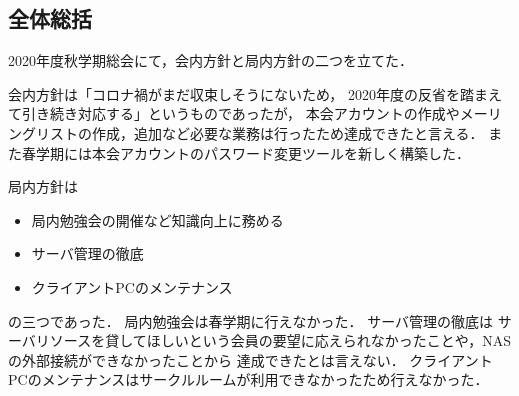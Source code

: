 \subsection*{全体総括}


2020年度秋学期総会にて，会内方針と局内方針の二つを立てた．

会内方針は「コロナ禍がまだ収束しそうにないため，
2020年度の反省を踏まえて引き続き対応する」というものであったが，
本会アカウントの作成やメーリングリストの作成，追加など必要な業務は行ったため達成できたと言える．
また春学期には本会アカウントのパスワード変更ツールを新しく構築した．

局内方針は
\begin{itemize}
  \item 局内勉強会の開催など知識向上に務める
  \item サーバ管理の徹底
  \item クライアントPCのメンテナンス
\end{itemize}
の三つであった．
局内勉強会は春学期に行えなかった．
サーバ管理の徹底は
サーバリソースを貸してほしいという会員の要望に応えられなかったことや，NASの外部接続ができなかったことから
達成できたとは言えない．
クライアントPCのメンテナンスはサークルルームが利用できなかったため行えなかった．
